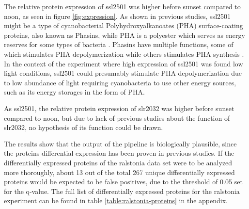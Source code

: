  The relative protein expression of ssl2501 was higher before sunset compared to noon, as seen in figure \ref{fig:expression}. As shown in previous studies, ssl2501 might be a type of cyanobacterial Polyhydroxyalkanoates (PHA) surface-coating proteins, also known as Phasins, while PHA is a polyester which serves as energy reserves for some types of bacteria \cite{phasins} \cite{ssl2501}. Phasins have multiple functions, some of which stimulates PHA depolymerization while others stimulates PHA synthesis \cite{phasins}. In the context of the experiment where high expression of ssl2501 was found low light conditions, ssl2501 could presumably stimulate PHA depolymerization due to low abundance of light requiring cyanobacteria to use other energy sources, such as its energy storages in the form of PHA.

As ssl2501, the relative protein expression of slr2032 was higher before sunset compared to noon, but due to lack of previous studies about the function of slr2032, no hypothesis of its function could be drawn.

The results show that the output of the pipeline is biologically plausible, since the proteins differential expression has been proven in previous studies. If the differentially expressed proteins of the ralstonia data set were to be analyzed more thoroughly, about 13 out of the total 267 unique  differentially expressed proteins would be expected to be false positives, due to the threshold of 0.05 set for the q-value. The full list of differentially expressed proteins for the ralstonia experiment can be found in table \ref{table:ralstonia-proteins} in the appendix.
